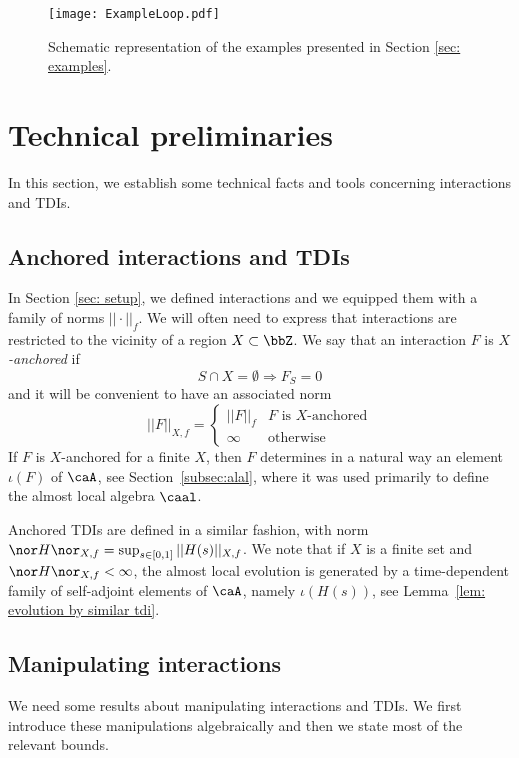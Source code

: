 \begin{figure}[ht] 
	\begin{center}
		\texttt{[image: ExampleLoop.pdf]}
		\caption{Schematic representation of the examples presented in Section \ref{sec: examples}.}
		\label{fig:ExampleLoop}
	\end{center}
\end{figure}


\section{Technical preliminaries}   \label{sec: technical preliminaries}
In this section, we establish some technical facts and tools concerning interactions and TDIs.  


\subsection{Anchored interactions and TDIs} \label{sec: anchored interactions}

In Section \ref{sec: setup}, we defined interactions and we equipped them with a family of norms $||\cdot||_f$. We will often need to express that interactions are restricted to the vicinity of a region $X\subset\bbZ$. We say that an interaction $F$ is \emph{$X$-anchored} if 
$$
S \cap X=\emptyset\Rightarrow  F_S=0
$$
and it will be convenient to have an associated norm
%
\begin{equation}\label{AnchoredInt}
	||F||_{X,f}=\begin{cases} ||F||_{f}   & \text{$F$ is $X$-anchored} \\
		\infty  &   \text{otherwise}
	\end{cases}
\end{equation}
%
If  $ F$ is $X$-anchored for a finite $X$, 
then $F$ determines in a natural way an element $\iota(F)$ of $\caA$, see Section~\ref{subsec:alal}, where it was used primarily to define the almost local algebra $\caal$.

Anchored TDIs are defined in a similar fashion, with norm $
\nor H \nor_{X,f}=\sup_{s\in[0,1]} ||H(s)||_{X,f}$. We note that if $X$ is a finite set and $\nor H \nor_{X,f}<\infty$, the almost local evolution is generated by a time-dependent family of self-adjoint elements of $\caA$, namely $\iota(H(s))$, see Lemma~\ref{lem: evolution by similar tdi}.


\subsection{Manipulating interactions} \label{sec: manipulating interactions}
We need some results about manipulating interactions and TDIs.
We first introduce these manipulations algebraically and then we state most of the relevant bounds. 
